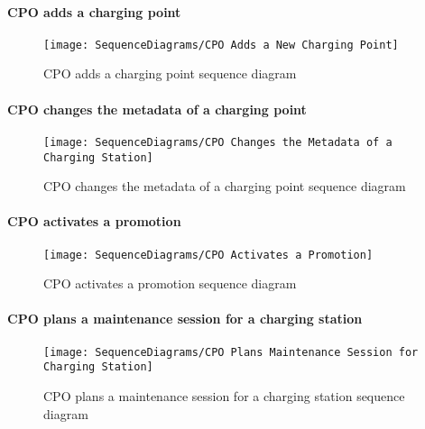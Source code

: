 \paragraph{CPO adds a charging point}
\begin{figure}[H]
    \begin{center}
        \texttt{[image: SequenceDiagrams/CPO Adds a New Charging Point]}
        \caption{CPO adds a charging point sequence diagram}
        \label{cpo_adds_new_charging_point}
    \end{center}
\end{figure}

\paragraph{CPO changes the metadata of a charging point}
\begin{figure}[H]
    \begin{center}
        \texttt{[image: SequenceDiagrams/CPO Changes the Metadata of a Charging Station]}
        \caption{CPO changes the metadata of a charging point sequence diagram}
        \label{cpo_changes_metadata_of_charging_station}
    \end{center}
\end{figure}

\paragraph{CPO activates a promotion}
\begin{figure}[H]
    \begin{center}
        \texttt{[image: SequenceDiagrams/CPO Activates a Promotion]}
        \caption{CPO activates a promotion sequence diagram}
        \label{cpo_activates_promotion}
    \end{center}
\end{figure}

\paragraph{CPO plans a maintenance session for a charging station}
\begin{figure}[H]
    \begin{center}
        \texttt{[image: SequenceDiagrams/CPO Plans Maintenance Session for Charging Station]}
        \caption{CPO plans a maintenance session for a charging station sequence diagram}
        \label{cpo_plans_maintenance_session_for_charging_station}
    \end{center}
\end{figure}


